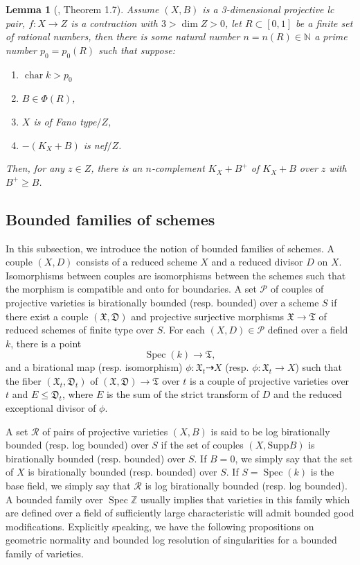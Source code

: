 \documentclass[letterpaper,reqno,12pt]{amsart}
\DeclareMathOperator{\Spec}{Spec}
\DeclareMathOperator{\chara}{char}
\numberwithin{equation}{section}
\theoremstyle{plain}
\newtheorem{lemma}[theorem]{Lemma}
\begin{document}
\begin{lemma}[\cite{complement1}, Theorem 1.7]\label{relacomp}
    Assume $(X,B)$ is a 3-dimensional projective lc pair, $f:X\to Z$ is a contraction with $3>\dim Z>0$, let $R\subset [0,1]$ be a finite set of rational numbers, then there is some natural number $n=n(R)\in\mathbb N$ a prime number $p_0=p_0(R)$ such that suppose:
    \begin{enumerate}
        \item $\chara k>p_0$
        \item $B\in\Phi(R)$,
        \item $X$ is of Fano type$/Z$,
        \item $-(K_X+B)$ is nef$/Z$.
    \end{enumerate}
    Then, for any $z\in Z$, there is an $n$-complement $K_X+B^+$ of $K_X+B$ over $z$ with $B^+\geq B$.
    
\end{lemma}

\subsection{Bounded families of schemes}
In this subsection, we introduce the notion of bounded families of schemes. A couple $(X,D)$ consists of a reduced scheme $X$ and a reduced divisor $D$ on $X$. Isomorphisms between couples are isomorphisms between the schemes such that the morphism is compatible and onto for boundaries. A set $\mathcal P$ of couples of projective varieties is birationally bounded (resp. bounded) over a scheme $S$ if there exist a couple $(\mathfrak X,\mathfrak D)$ and projective surjective morphisms $\mathfrak X\to \mathfrak T$ of reduced schemes of finite type over $S$. For each $(X,D)\in\mathcal P$ defined over a field $k$, there is a point 
\[\Spec(k)\to\mathfrak T,\] 
and a birational map (resp. isomorphism) $\phi:\mathfrak X_t\dashrightarrow X$ (resp. $\phi:\mathfrak X_t\to X$) such that the fiber $(\mathfrak X_t,\mathfrak D_t)$ of  $(\mathfrak X,\mathfrak D)\to \mathfrak T$ over $t$ is a couple of projective varieties over $t$ and $E\leq \mathfrak D_t$, where $E$ is the sum of the strict transform of $D$ and the reduced exceptional divisor of $\phi$. 

A set $\mathcal R$ of pairs of projective varieties $(X,B)$ is said to be log birationally bounded (resp. log bounded) over $S$ if the set of couples $(X,\text{Supp}B)$ is birationally bounded (resp. bounded) over $S$. If $B=0$, we simply say that the set of $X$ is birationally bounded (resp. bounded) over $S$. If $S=\Spec(k)$ is the base field, we simply say that $\mathcal R$ is log birationally bounded (resp. log bounded). A bounded family over $\Spec \mathbb Z$ usually implies that varieties in this family which are defined over a field of sufficiently large characteristic will admit  bounded good modifications. Explicitly speaking, we have the following propositions on geometric normality and bounded log resolution of singularities for a bounded family of varieties.
\end{document}
